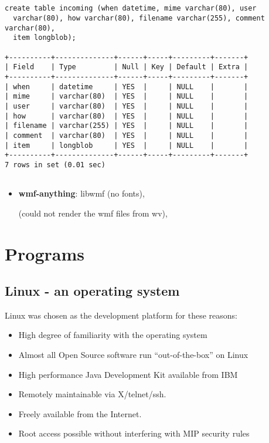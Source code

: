 \begin{verbatim}


create table incoming (when datetime, mime varchar(80), user
  varchar(80), how varchar(80), filename varchar(255), comment varchar(80),
  item longblob);

+----------+--------------+------+-----+---------+-------+
| Field    | Type         | Null | Key | Default | Extra |
+----------+--------------+------+-----+---------+-------+
| when     | datetime     | YES  |     | NULL    |       |
| mime     | varchar(80)  | YES  |     | NULL    |       |
| user     | varchar(80)  | YES  |     | NULL    |       |
| how      | varchar(80)  | YES  |     | NULL    |       |
| filename | varchar(255) | YES  |     | NULL    |       |
| comment  | varchar(80)  | YES  |     | NULL    |       |
| item     | longblob     | YES  |     | NULL    |       |
+----------+--------------+------+-----+---------+-------+
7 rows in set (0.01 sec)


\end{verbatim}

\begin{itemize}
\item \textbf{ wmf-anything}: libwmf (no fonts),
  
   (could
  not render the wmf files from wv),
  

  
\end{itemize}


\section{Programs}


\subsection{Linux - an operating system}
\label{sec:linux}

Linux was chosen as the development platform for these reasons:

\begin{itemize}
\item High degree of familiarity with the operating system
\item Almost all Open Source software run ``out-of-the-box'' on Linux
\item High performance Java Development Kit available from IBM
\item Remotely maintainable via X/telnet/ssh.
\item Freely available from the Internet.
\item Root access possible without interfering with MIP security rules
\end{itemize}

